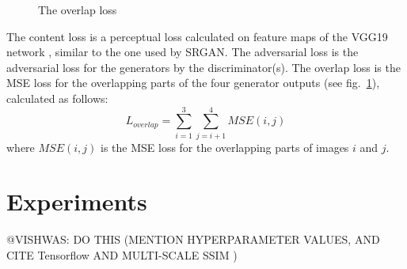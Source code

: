 \documentclass[12pt,a4paper,twocolumn]{article}
\begin{document}
        \begin{figure}
            \caption{The overlap loss}
            \label{fig:overlap}
        \end{figure}

        The content loss is a perceptual loss \cite{perceptual} calculated on feature maps of the VGG19 network \cite{vgg}, similar to the one used by SRGAN.
        The adversarial loss is the adversarial loss for the generators by the discriminator(s).
        The overlap loss is the MSE loss for the overlapping parts of the four generator outputs (see fig.~\ref{fig:overlap}), calculated as follows:
            $$L_{overlap} = \sum_{i=1}^3 \sum_{j=i+1}^4 MSE(i, j)$$
        where $MSE(i, j)$ is the MSE loss for the overlapping parts of images $i$ and $j$.

    \section{Experiments}
        @VISHWAS: DO THIS (MENTION HYPERPARAMETER VALUES, AND CITE Tensorflow \cite{tensorflow} AND MULTI-SCALE SSIM \cite{msssim})
\end{document}
